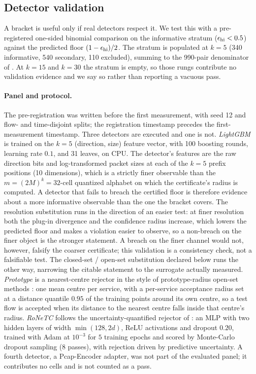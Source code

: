 \subsection{Detector validation}
\label{sec:results/detector_validation}

A bracket is useful only if real detectors respect it. We test this with a
pre-registered one-sided binomial comparison on the informative stratum
($\epsilon_{\mathrm{hi}} < 0.5$) against the predicted floor $(1-\epsilon_{\mathrm{hi}})/2$. The stratum is populated at $k{=}5$ (340 informative, 540 secondary, 110
excluded), summing to the 990-pair denominator of . At $k{=}15$ and $k{=}30$ the stratum is empty, so those
rungs contribute no validation evidence and we say so rather than reporting a
vacuous pass.

\paragraph{Panel and protocol.}
The pre-registration was written before the first measurement, with seed 12 and
flow- and time-disjoint splits; the registration timestamp precedes the
first-measurement timestamp. Three detectors are executed and one is not.
\emph{LightGBM} is trained on the $k{=}5$ (direction, size) feature vector, with
100 boosting rounds, learning rate $0.1$, and 31 leaves, on CPU. The detector's
features are the raw direction bits and log-transformed packet sizes at each of
the $k{=}5$ prefix positions (10 dimensions), which is a strictly finer
observable than the $m{=}(2M)^k{=}32$-cell quantized alphabet on which the
certificate's radius is computed. A detector that fails to breach the certified
floor is therefore evidence about a more informative observable than the one the
bracket covers. The resolution substitution runs in the direction of an easier
test: at finer resolution both the plug-in divergence and the confidence radius
increase, which lowers the predicted floor and makes a violation easier to
observe, so a non-breach on the finer object is the stronger statement. A breach
on the finer channel would not, however, falsify the coarser certificate; this
validation is a consistency check, not a falsifiable test. The closed-set /
open-set substitution declared below runs the other way, narrowing the citable
statement to the surrogate actually measured.
\emph{Prototype} is a nearest-centre rejector in the style of prototype-radius
open-set methods \citep{qu2026sepspace}: one mean centre per service, with a
per-service acceptance radius set at a distance quantile $0.95$ of the training
points around its own centre, so a test flow is accepted when its distance to
the nearest centre falls inside that centre's radius.
\emph{RoNeTC} follows the uncertainty-quantified rejector of
\citet{wang2025reliable}: an MLP with two hidden layers of width
$\min(128, 2d)$, ReLU activations and dropout $0.20$, trained with Adam at
$10^{-3}$ for $5$ training epochs and scored by Monte-Carlo dropout sampling
($8$ passes), with rejection driven by predictive uncertainty.
A fourth detector, a Pcap-Encoder adapter, was not part of the evaluated
panel; it contributes no cells and is not counted as a pass.

